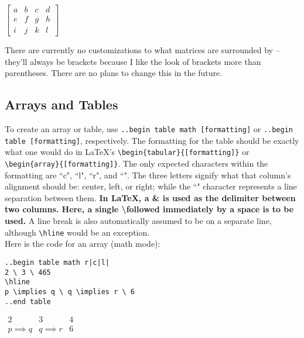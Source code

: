 \documentclass[12pt]{article}
\begin{document}
\begin{flushleft}
\medskip

$\begin{bmatrix}
a & b & c & d \\
e & f & g & h \\
i & j & k & l 
\end{bmatrix}$

\medskip

There are currently no customizations to what matrices are surrounded by -- they'll always be brackets because I like the look of brackets more than parentheses. There are no plans to change this in the future.

\newpage

\subsection*{Arrays and Tables}

To create an array or table, use \verb|..begin table math [formatting]| or \verb|..begin table [formatting]|, respectively. The formatting for the table should be exactly what one would do in LaTeX's \verb|\begin{tabular}{[formatting]}| or \verb|\begin{array}{[formatting]}|. The only expected characters within the formatting are ``c", ``l", ``r", and ``\textbar". The three letters signify what that column's alignment should be: center, left, or right; while the ``\textbar" character represents a line separation between them. \textbf{In LaTeX, a \& is used as the delimiter between two columns. Here, a single \textbackslash followed immediately by a space is to be used.} A line break is also automatically assumed to be on a separate line, although \verb|\hline| would be an exception. \\
\medskip
Here is the code for an array (math mode): \\
\medskip

\verb=..begin table math r|c|l|= \\
\verb|2 \ 3 \ 465| \\
\verb|\hline| \\
\verb|p |\verb|\implies q \ q \implies r \ 6| \\
\verb|..end table|

\bigskip

$\begin{array}{r|c|l|}
2 & 3 & 4 \\
\hline
p \implies q & q \implies r & 6 
\end{array}$


\end{flushleft}
\end{document}
